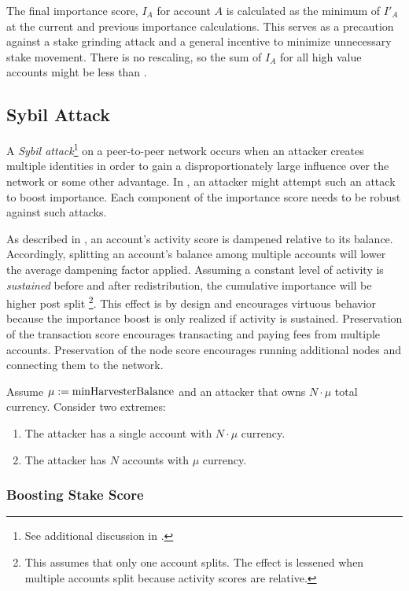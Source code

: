 The final importance score, $I_A$ for account $A$ is calculated as the minimum of $I'_A$ at the current and previous importance calculations.
This serves as a precaution against a stake grinding attack and a general incentive to minimize unnecessary stake movement.
There is no rescaling, so the sum of $I_A$ for all high value accounts might be less than .

\subsection{Sybil Attack}

A \emph{Sybil attack}\footnote{See additional discussion in .} on a peer-to-peer network occurs when an attacker
creates multiple identities in order to gain a disproportionately large influence over the network or some other advantage.
In \codename, an attacker might attempt such an attack to boost importance.
Each component of the importance score needs to be robust against such attacks.

As described in , an account's activity score is dampened relative to its balance.
Accordingly, splitting an account's balance among multiple accounts will lower the average dampening factor applied.
Assuming a constant level of activity is \emph{sustained} before and after redistribution, the cumulative importance will be higher post split
\footnote{
	This assumes that only one account splits.
	The effect is lessened when multiple accounts split because activity scores are relative.
}.
This effect is by design and encourages virtuous behavior because the importance boost is only realized if activity is sustained.
Preservation of the transaction score encourages transacting and paying fees from multiple accounts.
Preservation of the node score encourages running additional nodes and connecting them to the network.

Assume $\mu := \nemsetting{network}{minHarvesterBalance}$ and an attacker that owns $N \cdot \mu$ total currency.
Consider two extremes:

\begin{enumerate}
	\item{The attacker has a single account with $N \cdot \mu$ currency.}
	\item{The attacker has $N$ accounts with $\mu$ currency.}
\end{enumerate}

\subsubsection*{Boosting Stake Score}


